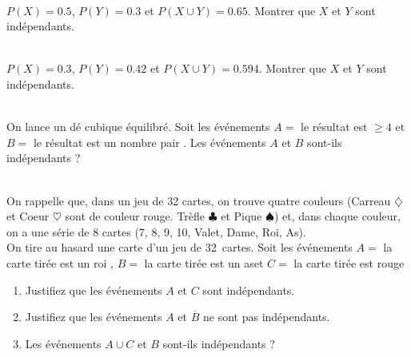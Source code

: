 \documentclass[main.tex]{subfiles}
\begin{document}
\begin{exercise} \label{chapter02:exercise:C03} \hfill \\
	$P(X)=0.5$, $P(Y)=0.3$ et $P(X\cup Y)=0.65$. Montrer que $X$ et $Y$ sont indépendants.
\end{exercise}
\begin{exercise}\label{chapter02:exercise:C04} \hfill \\
	$P(X)=0.3$, $P(Y)=0.42$ et $P(X\cup Y)=0.594$. Montrer que $X$ et $Y$ sont indépendants.
\end{exercise}
\begin{exercise}\label{chapter02:exercise:C05} \hfill \\
	On lance un dé cubique équilibré. Soit les événements $A=$  \og le résultat est $\geqslant 4$ \fg{} et $B=$ \og le résultat est un nombre pair \fg{}. Les événements $A$ et $B$ sont-ils indépendants ?
\end{exercise}\smallskip
\begin{exercise}\label{chapter02:exercise:C06} \hfill \\
	On rappelle que, dans un jeu de 32 cartes, on trouve quatre couleurs (Carreau $\diamondsuit$ et Coeur $\heartsuit$ sont de couleur rouge. Trèfle $\clubsuit$ et Pique $\spadesuit$) et, dans chaque couleur, on a une série de 8 cartes (7, 8, 9, 10, Valet, Dame, Roi, As). \\
	On tire au hasard une carte d'un jeu de 32~cartes. Soit les événements   $A=$ \og la carte tirée est un roi \fg,  $B=$ \og la carte tirée est un as\fg  et  $C=$ \og la carte tirée est rouge\fg   
	\begin{enumerate}[label=\arabic*),leftmargin=*]
		\item Justifiez que les événements $A$ et $C$ sont indépendants.
		\item Justifiez que les événements $A$ et $\overline{B}$ ne sont pas indépendants.
		\item Les événements $A\cup C$ et $B$ sont-ils indépendants ?
	\end{enumerate}
\end{exercise}
\end{document}
